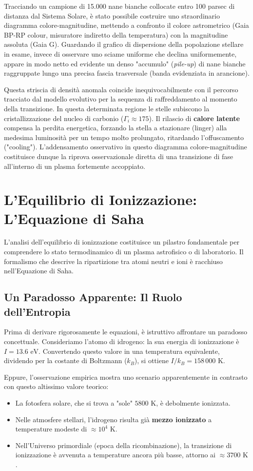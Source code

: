 Tracciando un campione di 15.000 nane bianche collocate entro 100 parsec di distanza dal Sistema Solare, è stato possibile costruire uno straordinario diagramma colore-magnitudine, mettendo a confronto il colore astrometrico (Gaia BP-RP colour, misuratore indiretto della temperatura) con la magnitudine assoluta (Gaia G).
Guardando il grafico di dispersione della popolazione stellare in esame, invece di osservare uno sciame uniforme che declina uniformemente, appare in modo netto ed evidente un denso "accumulo" (\textit{pile-up}) di nane bianche raggruppate lungo una precisa fascia trasversale (banda evidenziata in arancione).

Questa striscia di densità anomala coincide inequivocabilmente con il percorso tracciato dal modello evolutivo per la sequenza di raffreddamento al momento della transizione. In questa determinata regione le stelle subiscono la cristallizzazione del nucleo di carbonio ($\Gamma_i \approx 175$). Il rilascio di \textbf{calore latente} compensa la perdita energetica, forzando la stella a stazionare (linger) alla medesima luminosità per un tempo molto prolungato, ritardando l'offuscamento ("cooling"). L'addensamento osservativo in questo diagramma colore-magnitudine costituisce dunque la riprova osservazionale diretta di una transizione di fase all'interno di un plasma fortemente accoppiato.

\section{L'Equilibrio di Ionizzazione: L'Equazione di Saha}

L'analisi dell'equilibrio di ionizzazione costituisce un pilastro fondamentale per comprendere lo stato termodinamico di un plasma astrofisico o di laboratorio. Il formalismo che descrive la ripartizione tra atomi neutri e ioni è racchiuso nell'Equazione di Saha.

\subsection{Un Paradosso Apparente: Il Ruolo dell'Entropia}
Prima di derivare rigorosamente le equazioni, è istruttivo affrontare un paradosso concettuale. Consideriamo l'atomo di idrogeno: la sua energia di ionizzazione è $I = 13.6 \text{ eV}$. Convertendo questo valore in una temperatura equivalente, dividendo per la costante di Boltzmann ($k_B$), si ottiene $I/k_B = 158\,000 \text{ K}$.

Eppure, l'osservazione empirica mostra uno scenario apparentemente in contrasto con questo altissimo valore teorico:
\begin{itemize}
\item La fotosfera solare, che si trova a "sole" $5800 \text{ K}$, è debolmente ionizzata.
\item Nelle atmosfere stellari, l'idrogeno risulta già \textbf{mezzo ionizzato} a temperature modeste di $\approx 10^4 \text{ K}$.
\item Nell'Universo primordiale (epoca della ricombinazione), la transizione di ionizzazione è avvenuta a temperature ancora più basse, attorno ai $\approx 3700 \text{ K}$.
\end{itemize}

